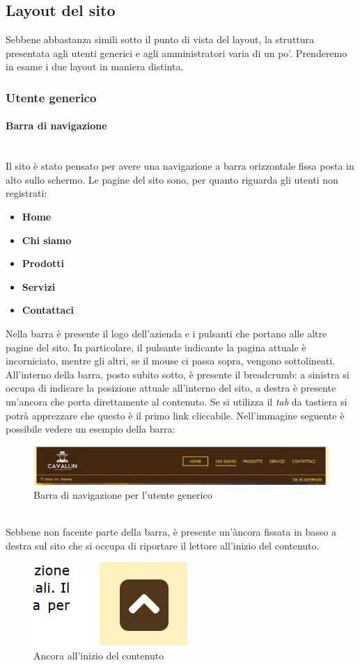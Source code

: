 \subsection{Layout del sito}
Sebbene abbastanza simili sotto il punto di vista del layout, la struttura presentata agli utenti generici e agli amministratori varia di un po'. Prenderemo in esame i due layout in maniera distinta.
\subsubsection{Utente generico}
\paragraph{Barra di navigazione}
~\\Il sito è stato pensato per avere una navigazione a barra orizzontale fissa posta in alto sullo schermo. Le pagine del sito sono, per quanto riguarda gli utenti non registrati:
\begin{itemize}
	\item \textbf{Home}
	\item \textbf{Chi siamo}
	\item \textbf{Prodotti}
	\item \textbf{Servizi}
	\item \textbf{Contattaci}
\end{itemize}
Nella barra è presente il logo dell'azienda e i pulsanti che portano alle altre pagine del sito. In particolare, il pulsante indicante la pagina attuale è incorniciato, mentre gli altri, se il mouse ci passa sopra, vengono sottolineati. All'interno della barra, posto subito sotto, è presente il breadcrumb: a sinistra si occupa di indicare la posizione attuale all'interno del sito, a destra è presente un'ancora che porta direttamente al contenuto. Se si utilizza il \emph{tab} da tastiera si potrà apprezzare che questo è il primo link cliccabile. Nell'immagine seguente è possibile vedere un esempio della barra:
\begin{figure}[h!]
	\centerline{\includegraphics[scale=0.45]{img/barra_navigazione.jpg}}
	\caption{Barra di navigazione per l'utente generico}
	\label{fig:navbarGU}
\end{figure}
~\\Sebbene non facente parte della barra, è presente un'àncora fissata in basso a destra sul sito che si occupa di riportare il lettore all'inizio del contenuto.
\begin{figure}[h!]
	\centerline{\includegraphics[scale=0.45]{img/jump_to_menu.jpg}}
	\caption{Ancora all'inizio del contenuto}
	\label{fig:anchor}
\end{figure}
